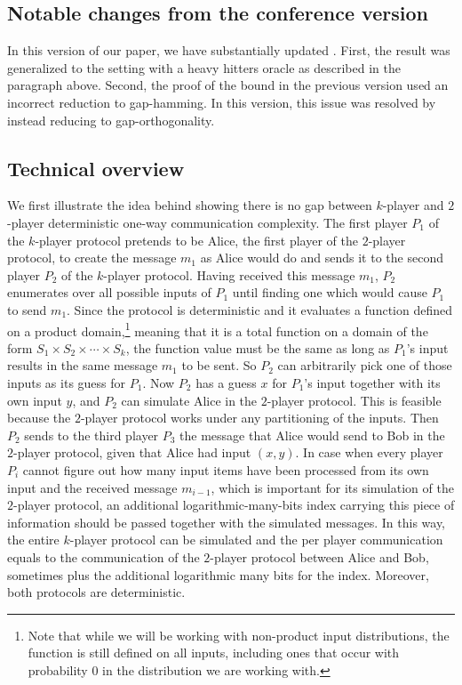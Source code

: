 %
\subsection{Notable changes from the conference version}
In this version of our paper, we have substantially updated . %
First,  %
the result was generalized to the setting with a heavy hitters oracle as described in the paragraph above. %
Second,  %
the proof of the bound in the previous version used an incorrect reduction to gap-hamming. In this version, this issue was resolved by instead reducing to gap-orthogonality.

\subsection{Technical overview}
We first illustrate the 
idea behind showing there is no gap between $k$-player and $2$-player
deterministic one-way communication complexity. The first player $P_1$
of the $k$-player protocol pretends to be Alice, the first player of the $2$-player protocol, 
to create the message $m_1$ as Alice would do
and sends it to the second player $P_2$ of the $k$-player protocol. 
Having received this message $m_1$,
$P_2$  enumerates over all possible
inputs of $P_1$ until finding one
which would cause $P_1$ to send $m_1$. 
Since the protocol is deterministic and it evaluates a function defined on a product domain,\footnote{{\color{black} Note that while we will be working with non-product input distributions, the function is still defined on all inputs, including ones that occur with probability 0 in the distribution we are working with.}} meaning that it is a total function on a domain of the form $S_1 \times S_2 \times \cdots \times S_k$, 
the function value must be the same as long as $P_1$'s input results in the same message $m_1$ to be sent.
So $P_2$ can arbitrarily pick one of those inputs as its guess for $P_1$.
Now $P_2$ has a guess $x$ for $P_1$'s input together
with its own input $y$, and $P_2$ can simulate Alice in the $2$-player protocol. 
This is feasible because the $2$-player protocol works under any partitioning of the inputs. 
Then $P_2$ sends to the third player $P_3$ the message that Alice would send to Bob in the $2$-player protocol, 
given that Alice had input $(x,y)$.
In case when every player $P_i$ cannot figure out how many input items have been processed from its own input and the received message $m_{i-1}$, which is important for its simulation of the $2$-player protocol,
an additional logarithmic-many-bits index carrying this piece of information should be passed together with the simulated messages.
In this way, the entire $k$-player protocol can be simulated
and the per player communication equals to the communication of the $2$-player protocol between Alice and Bob, sometimes plus the additional logarithmic many bits for the index. 
Moreover, both protocols are deterministic. 


